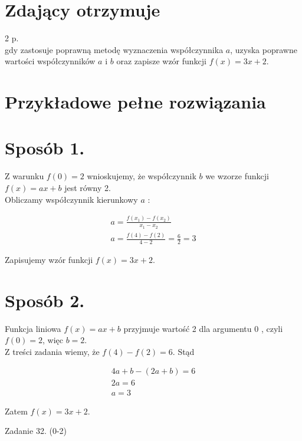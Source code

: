 \documentclass[10pt]{article}
\begin{document}
\section*{Zdający otrzymuje}
2 p.\\
gdy zastosuje poprawną metodę wyznaczenia współczynnika $a$, uzyska poprawne wartości współczynników $a$ i $b$ oraz zapisze wzór funkcji $f(x)=3 x+2$.

\section*{Przykładowe pełne rozwiązania}
\section*{Sposób 1.}
Z warunku $f(0)=2$ wnioskujemy, że współczynnik $b$ we wzorze funkcji $f(x)=a x+b$ jest równy 2.\\
Obliczamy współczynnik kierunkowy $a$ :

$$
\begin{gathered}
a=\frac{f\left(x_{1}\right)-f\left(x_{2}\right)}{x_{1}-x_{2}} \\
a=\frac{f(4)-f(2)}{4-2}=\frac{6}{2}=3
\end{gathered}
$$

Zapisujemy wzór funkcji $f(x)=3 x+2$.

\section*{Sposób 2.}
Funkcja liniowa $f(x)=a x+b$ przyjmuje wartość 2 dla argumentu 0 , czyli $f(0)=2$, więc $b=2$.\\
Z treści zadania wiemy, że $f(4)-f(2)=6$. Stąd

$$
\begin{gathered}
4 a+b-(2 a+b)=6 \\
2 a=6 \\
a=3
\end{gathered}
$$

Zatem $f(x)=3 x+2$.

Zadanie 32. (0-2)
\end{document}
